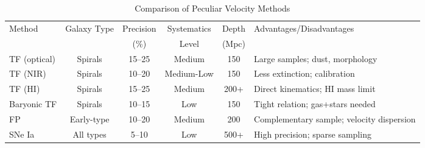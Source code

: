 \begin{table*}
\centering
\caption{Comparison of Peculiar Velocity Methods}
\label{tab:method_comparison}
\begin{tabular}{lccccl}
\hline
Method & Galaxy Type & Precision & Systematics & Depth & Advantages/Disadvantages \\
       &             & (\%)      & Level       & (Mpc)  &                          \\
\hline
TF (optical) & Spirals & 15--25 & Medium & 150 & Large samples; dust, morphology \\
TF (NIR) & Spirals & 10--20 & Medium-Low & 150 & Less extinction; calibration \\
TF (HI) & Spirals & 15--25 & Medium & 200+ & Direct kinematics; HI mass limit \\
Baryonic TF & Spirals & 10--15 & Low & 150 & Tight relation; gas+stars needed \\
FP & Early-type & 10--20 & Medium & 200 & Complementary sample; velocity dispersion \\
SNe Ia & All types & 5--10 & Low & 500+ & High precision; sparse sampling \\
\hline
\end{tabular}
\end{table*}